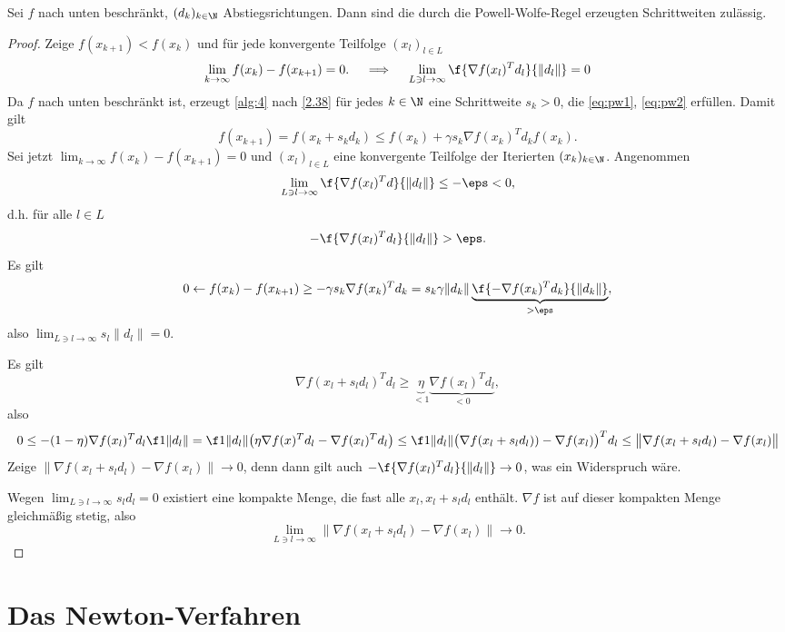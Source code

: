 \begin{st} \label{2.39}
	Sei $f$ nach unten beschränkt, $(d_k)_{k\in\N}$ Abstiegsrichtungen.
	Dann sind die durch die Powell-Wolfe-Regel erzeugten Schrittweiten zulässig.
	\begin{proof}
		Zeige $f(x_{k+1}) < f(x_k)$ und für jede konvergente Teilfolge $(x_l)_{l\in L}$
		\[
			\lim_{k\to\infty} f(x_k) - f(x_{k+1}) = 0.
			\quad\implies\quad
			\lim_{L\ni l \to\infty} \f{\nabla f(x_l)^T d_l}{\|d_l\|} = 0
		\]
		Da $f$ nach unten beschränkt ist, erzeugt \ref{alg:4} nach \ref{2.38} für jedes $k \in \N$ eine Schrittweite $s_k > 0$, die \ref{eq:pw1}, \ref{eq:pw2} erfüllen.
		Damit gilt
		\[
			f(x_{k+1})
			= f(x_k + s_k d_k)
			\le f(x_k) + \gamma s_k \nabla f(x_k)^T d_k
			f(x_k).
		\]
		Sei jetzt $\lim_{k\to\infty} f(x_k) - f(x_{k+1}) = 0$ und $(x_l)_{l\in L}$ eine konvergente Teilfolge der Iterierten $(x_k)_{k\in\N}$.
		Angenommen
		\[
			\lim_{L\ni l\to\infty} \f{\nabla f(x_l)^T d}{\|d_l\|} \le -\eps < 0,
		\]
		d.h. \oBdA für alle $l \in L$
		\[
			- \f {\nabla f(x_l)^T d_l}{\|d_l\|} > \eps.
		\]
		Es gilt
		\[
			0 \leftarrow
			f(x_k) - f(x_{k+1})
			\ge -\gamma s_k \nabla f(x_k)^T d_k
			= s_k \gamma \|d_k\| \underbrace{\f{-\nabla f(x_k)^T d_k}{\|d_k\|}}_{> \eps},
		\]
		also $\lim_{L\ni l\to\infty} s_l \|d_l\| = 0$.

		Es gilt
		\[
			\nabla f(x_l + s_l d_l)^T d_l \ge \underbrace{\eta}_{<1} \underbrace{\nabla f(x_l)^T d_l}_{<0},
		\]
		also
		\[
			0
			\le -(1-\eta)\nabla f(x_l)^T d_l \f 1{\|d_l\|}
			= \f 1{\|d_l\|}\big( \eta \nabla f(x)^T d_l - \nabla f(x_l)^T d_l \big)
			\le \f 1{\|d_l\|} \big( \nabla f(x_l + s_l d_l)) - \nabla f(x_l) \big)^T d_l
			\le \big\|\nabla f(x_l + s_l d_l) -\nabla f(x_l) \big\|
		\]
		Zeige $\|\nabla f(x_l + s_l d_l) -\nabla f(x_l)\| \to 0$, denn dann gilt auch $- \f{\nabla f(x_l)^T d_l}{\|d_l\|} \to 0$, was ein Widerspruch wäre.

		Wegen $\lim_{L\ni l\to\infty} s_l d_l = 0$ existiert eine kompakte Menge, die fast alle $x_l, x_l + s_l d_l$ enthält.
		$\nabla f$ ist auf dieser kompakten Menge gleichmäßig stetig, also
		\[
			\lim_{L\ni l\to\infty} \big\|\nabla f(x_l + s_l d_l) -\nabla f(x_l) \big\| \to 0.
		\]
	\end{proof}
\end{st}


\section{Das Newton-Verfahren}


